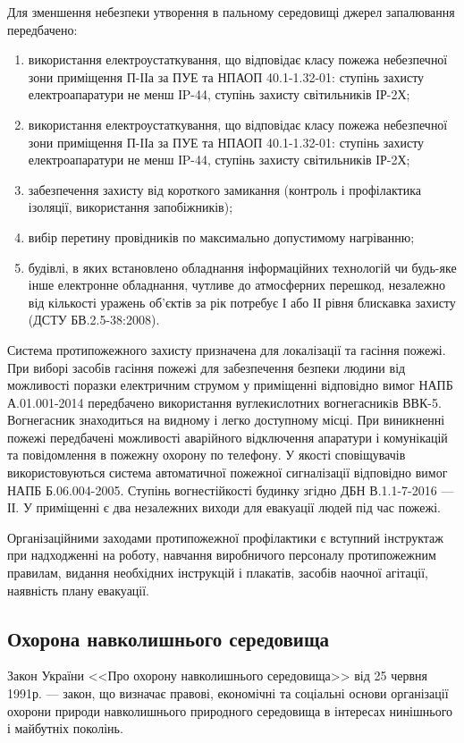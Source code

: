 Для зменшення небезпеки утворення в пальному середовищі джерел запалювання передбачено:
\begin{enumerate}[label={\arabic*)}]
	\item використання електроустаткування, що відповідає класу пожежа небезпечної зони приміщення П-ІІа за ПУЕ та НПАОП 40.1-1.32-01: ступінь захисту електроапаратури не менш ІP-44, ступінь захисту світильників ІР-2Х;
	\item використання електроустаткування, що відповідає класу пожежа небезпечної зони приміщення П-ІІа за ПУЕ та НПАОП 40.1-1.32-01: ступінь захисту електроапаратури не менш ІP-44, ступінь захисту світильників ІР-2Х;
	\item забезпечення захисту від короткого замикання (контроль і профілактика ізоляції, використання запобіжників);
	\item вибір перетину провідників по максимально допустимому нагріванню;
	\item будівлі, в яких встановлено обладнання інформаційних технологій чи будь-яке інше електронне обладнання, чутливе до атмосферних перешкод, незалежно від кількості уражень об'єктів за рік потребує І або ІІ рівня блискавка захисту (ДСТУ БВ.2.5-38:2008).
\end{enumerate}

Система протипожежного захисту призначена для локалізації та гасіння пожежі. При виборі засобів гасіння пожежі для забезпечення безпеки людини від можливості поразки електричним струмом у приміщенні відповідно вимог НАПБ А.01.001-2014 передбачено використання вуглекислотних вогнегасникiв ВВК-5. Вогнегасник знаходиться на видному і легко доступному місці. При виникненні пожежі передбачені можливості аварійного відключення апаратури і комунікацій та повідомлення в пожежну охорону по телефону. У якості сповіщувачів використовуються система автоматичної пожежної сигналізації відповідно вимог НАПБ Б.06.004-2005. Ступінь вогнестійкості будинку згідно ДБН В.1.1-7-2016 --- ІІ. У приміщенні є два незалежних виходи для евакуації людей під час пожежі.

Організаційними заходами протипожежної профілактики є вступний інструктаж при надходженні на роботу, навчання виробничого персоналу протипожежним правилам, видання необхідних інструкцій і плакатів, засобів наочної агітації, наявність плану евакуації.%

\subsection{Охорона навколишнього середовища}
Закон України <<Про охорону навколишнього середовища>> від 25 червня 1991р. --- закон, що визначає правові, економічні та соціальні основи організації охорони природи навколишнього природного середовища в інтересах нинішнього і майбутніх поколінь.

